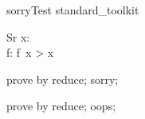 \begin{zsection}
   \SECTION sorryTest \parents standard\_toolkit
\end{zsection}

\begin{schema}{Sr}
   x: \nat \\
   f: \nat \fun \nat
\where
   f~x > x
\end{schema}

\begin{zproof}[Sr\$domainCheck]
   prove by reduce;
   sorry;
\end{zproof}

\begin{zproof}[Sr\$domainCheck]
   prove by reduce;
   oops;
\end{zproof}
